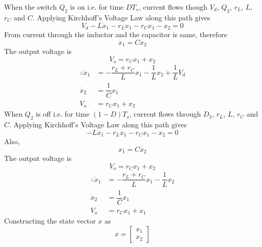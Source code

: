 	When the switch $Q_2$ is on i.e. for time $DT_s$, current flows though $V_d$, $Q_2$, $r_{L}$, $L$, $r_{C}$ and $C$. Applying Kirchhoff's Voltage Law along this path gives
	\begin{equation}
		V_d - L \dot{x}_1 - r_{L}x_1 - r_{C}x_1-x_2 = 0
		\label{eq:mod1}
	\end{equation}
	From current through the inductor and the capacitor is same, therefore
	\begin{equation}
		x_1 = C\dot{x_2} 
		\label{eq:mod2}
	\end{equation}
	The output voltage is
	\begin{equation}
		V_o = r_{C}x_1 + x_2
		\label{eq:mod3}
	\end{equation}
	\begin{equation}
		\begin{split}
		\therefore \dot{x}_1 &= -\dfrac{r_{L}+r_{C}}{L}x_1 -\dfrac{1}{L}x_2+\dfrac{1}{L}V_d\\
		\dot{x}_2 &= \dfrac{1}{C}x_1\\
		V_o &= r_{C}x_1 + x_2
		\end{split}
		\label{eq:mod4}
	\end{equation}
	When $Q_2$ is off i.e. for time $(1-D)T_s$, current flows through  $D_3$, $r_{L}$, $L$, $r_{C}$ and $C$. Applying Kirchhoff's Voltage Law along this path gives
	\begin{equation}
		- L \dot{x}_1 - r_{L}x_1 - r_{C}x_1-x_2 = 0
		\label{eq:mod5}
	\end{equation}
	Also,
	\begin{equation}
		x_1 = C\dot{x_2} 
		\label{eq:mod6}
	\end{equation}
	The output voltage is
	\begin{equation}
		V_o = r_{C}x_1 + x_2
		\label{eq:mod7}
	\end{equation}
	\begin{equation}
		\begin{split}
			\therefore \dot{x}_1 &= -\dfrac{r_{L}+r_{C}}{L}x_1 -\dfrac{1}{L}x_2\\
			\dot{x}_2 &= \dfrac{1}{C}x_1\\
			V_o &= r_{C}x_1 + x_1
		\end{split}
		\label{eq:mod8}
	\end{equation}
	Constructing the state vector $x$ as
	\begin{equation}
		x =
		\begin{bmatrix}
			x_1\\x_2
		\end{bmatrix}
		\label{eq:mod9}
	\end{equation}
